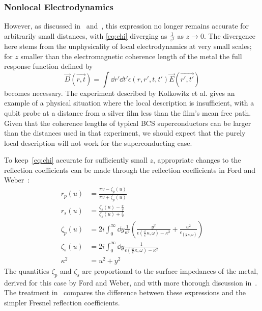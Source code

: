 \documentclass[%
 preprint,
 amsmath,amssymb,
 aps,
]{revtex4-2}
\begin{document}
\subsubsection{Nonlocal Electrodynamics} \label{subsubsec:nonlocalelectrodynamics}
However, as discussed in~\cite{QubitRelax} and~\cite{Henkel2006}, this expression no longer remains accurate for arbitrarily small distances, with \eqref{eq:chi} diverging as $\frac{1}{z^3}$ as $z \rightarrow 0$.
The divergence here stems from the unphysicality of local electrodynamics at very small scales;
for $z$ smaller than the electromagnetic coherence length of the metal the full response function defined by
\begin{equation}
	\vec{D}(\vec{r, t}) = \int \dd{r'} \dd{t'} \epsilon(r, r', t, t') \vec{E}(\vec{r', t'})
\end{equation}
becomes necessary.
The experiment described by Kolkowitz et al.\cite{Kolkowitz2015} gives an example of a physical situation where the local description is insufficient, with a qubit probe at a distance from a silver film less than the film's mean free path.
Given that the coherence lengths of typical BCS superconductors can be larger than the distances used in that experiment, we should expect that the purely local description will not work for the superconducting case.

To keep~\eqref{eq:chi} accurate for sufficiently small $z$, appropriate changes to the reflection coefficients can be made\cite{QubitRelax,Henkel2006} through the reflection coefficients in Ford and Weber~\cite{Ford1984}:
\begin{align}
	r_p(u) &= \frac{\pi v - \zeta_p(u)}{\pi v + \zeta_p(u)} \\
	r_s(u) &= \frac{\zeta_s(u) - \frac{\pi}{v}}{\zeta_s(u) + \frac{\pi}{v}} \\
	\zeta_p(u) &= 2i \int_0^\infty \dd{y} \frac{1}{\kappa^2} \left( \frac{y^2}{\epsilon(\frac{\omega}{c}\kappa, \omega) - \kappa^2} + \frac{u^2}{\epsilon_(\frac{\omega}{c}\kappa, \omega)} \right) \label{eq:zp} \\
	\zeta_s(u) &= 2i \int_0^\infty \dd{y} \frac{1}{\epsilon(\frac{\omega}{c}\kappa, \omega) - \kappa^2} \label{eq:zs} \\
	\kappa^2 &= u^2 + y^2
\end{align}
The quantities $\zeta_p$ and $\zeta_s$ are proportional to the surface impedances of the metal, derived for this case by Ford and Weber\cite{Ford1984}, and with more thorough discussion in~\cite{LandauLifshitzElectrodynamics}.
The treatment in~\cite{QubitRelax} compares the difference between these expressions and the simpler Fresnel reflection coefficients.
\end{document}
